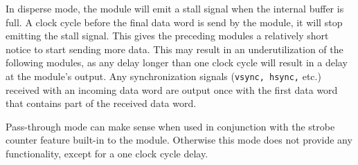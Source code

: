 In disperse mode, the module will emit a stall signal when the internal buffer is full.
A clock cycle before the final data word is send by the module, it will stop emitting the stall signal.
This gives the preceding modules a relatively short notice to start sending more data.
This may result in an underutilization of the following modules, as any delay longer than one clock cycle will result in a delay at the module's output.
Any synchronization signals (\texttt{vsync, hsync,} etc.) received with an incoming data word are output once with the first data word that contains part of the received data word.


Pass-through mode can make sense when used in conjunction with the strobe counter feature built-in to the module.
Otherwise this mode does not provide any functionality, except for a one clock cycle delay.

